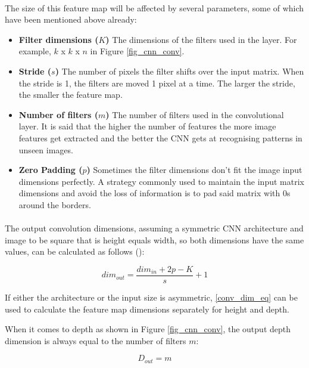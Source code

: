 \paragraph{}     
The size of this feature map will be affected by several parameters, some of which have been mentioned above already:

\begin{itemize}
    \item \textbf{Filter dimensions ($K$)} The dimensions of the filters used in the layer. For example, $k$ x $k$ x $n$ in Figure \ref{fig_cnn_conv}.
    \item \textbf{Stride ($s$)} The number of pixels the filter shifts over the input matrix. When the stride is 1, the filters are moved 1 pixel at a time. The larger the stride, the smaller the feature map.
    \item \textbf{Number of filters ($m$)} The number of filters used in the convolutional layer. It is said that the higher the number of features the more image features get extracted and the better the \gls{CNN} gets at recognising patterns in unseen images.
    \item \textbf{Zero Padding ($p$)} Sometimes the filter dimensions don't fit the image input dimensions perfectly. A strategy commonly used to maintain the input matrix dimensions and avoid the loss of information is to pad said matrix with 0s around the borders.
\end{itemize}

\paragraph{}     
The output convolution dimensions, assuming a symmetric \gls{CNN} architecture and image to be square that is height equals width, so both dimensions have the same values, can be calculated as follows (\cite{dumoulin2018guide}):

\begin{equation}
    \label{conv_dim_eq}
    dim_{out} = \frac{dim_{in} + 2p - K}{s} + 1
\end{equation}

If either the architecture or the input size is asymmetric, \ref{conv_dim_eq} can be used to calculate the feature map dimensions separately for height and depth.

When it comes to depth as shown in Figure \ref{fig_cnn_conv}, the output depth dimension is always equal to the number of filters $m$:

\begin{equation}
    \label{conv_depth_eq}
    D_{out} = m
\end{equation}

